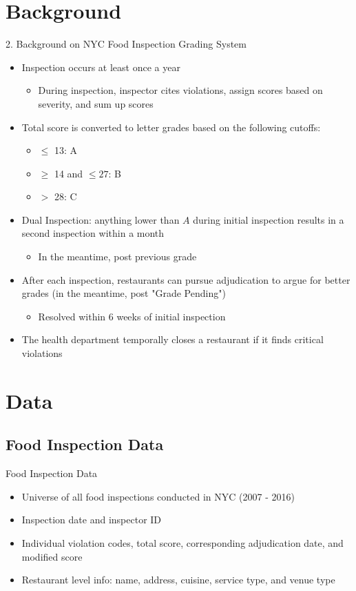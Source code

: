 \documentclass[handout]{beamer}
\begin{document}
\section{Background}
\begin{frame}{2. Background on NYC Food Inspection Grading System}
\begin{itemize}
    \pause
    \item Inspection occurs at least once a year
    \begin{itemize}
    \item During inspection, inspector cites violations, assign scores based on severity, and sum up scores
    \end{itemize}
    \pause
    \item Total score is converted to letter grades based on the following cutoffs:
    \begin{itemize}
    \item $\leq$ 13: A
    \item $\geq$ 14 and $\leq 27$: B 
    \item $>$ 28: C
    \end{itemize}
    \pause
    \item Dual Inspection: anything lower than $A$ during initial inspection results in a second inspection within a month
    \begin{itemize}
        \item In the meantime, post previous grade
    \end{itemize}
    \pause
    \item After each inspection, restaurants can pursue adjudication to argue for better grades (in the meantime, post "Grade Pending")
    \begin{itemize}
    \item Resolved within 6 weeks of initial inspection
    \end{itemize}
    \item The health department temporally closes a restaurant if it finds critical violations 
\end{itemize}
\end{frame}

\section{Data}
\subsection{Food Inspection Data}
\begin{frame}{Food Inspection Data}
\begin{itemize}
\item Universe of all food inspections conducted in NYC (2007 - 2016) 
\pause
\item Inspection date and inspector ID
\pause
\item Individual violation codes, total score, corresponding adjudication date, and modified score  
\pause
\item Restaurant level info: name, address, cuisine, service type, and venue type
\end{itemize}
\end{frame}
\end{document}
